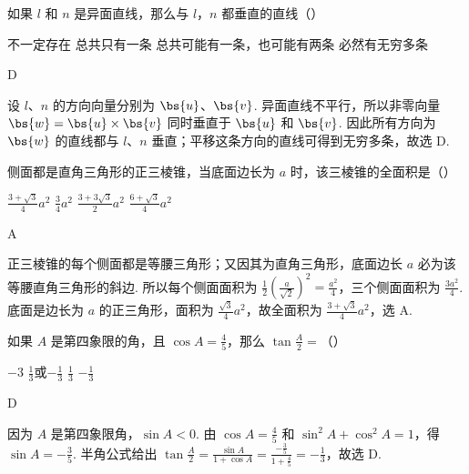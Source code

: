 \documentclass[UTF8,a4paper,oneside,11pt]{ctexbook}
\begin{document}
\begin{problem}
如果 \(l\) 和 \(n\) 是异面直线，那么与 \(l\)，\(n\) 都垂直的直线（\quad）

\choices
    {不一定存在}
    {总共只有一条}
    {总共可能有一条，也可能有两条}
    {必然有无穷多条}
\end{problem}

\begin{answer}
D
\end{answer}

\begin{solution}
设 \(l\)、\(n\) 的方向向量分别为 \(\bs{u}\)、\(\bs{v}\). 异面直线不平行，所以非零向量 \(\bs{w}=\bs{u}\times\bs{v}\) 同时垂直于 \(\bs{u}\) 和 \(\bs{v}\). 因此所有方向为 \(\bs{w}\) 的直线都与 \(l\)、\(n\) 垂直；平移这条方向的直线可得到无穷多条，故选 D.
\end{solution}

\begin{problem}
侧面都是直角三角形的正三棱锥，当底面边长为 \(a\) 时，该三棱锥的全面积是（\quad）

\choices
    {\(\frac{3+\sqrt{3}}{4}a^2\)}
    {\(\frac{3}{4}a^2\)}
    {\(\frac{3+3\sqrt{3}}{2}a^2\)}
    {\(\frac{6+\sqrt{3}}{4}a^2\)}
\end{problem}

\begin{answer}
A
\end{answer}

\begin{solution}
正三棱锥的每个侧面都是等腰三角形；又因其为直角三角形，底面边长 \(a\) 必为该等腰直角三角形的斜边. 所以每个侧面面积为 \(\frac12\left(\frac a{\sqrt2}\right)^2=\frac{a^2}{4}\)，三个侧面面积为 \(\frac{3a^2}{4}\). 底面是边长为 \(a\) 的正三角形，面积为 \(\frac{\sqrt3}{4}a^2\)，故全面积为 \(\frac{3+\sqrt3}{4}a^2\)，选 A.
\end{solution}

\begin{problem}
如果 \(A\) 是第四象限的角，且 \(\cos A=\frac{4}{5}\)，那么 \(\tan \frac{A}{2}=\)（\quad）

\choices
    {\(-3\)}
    {\(\frac{1}{3}\)或\(-\frac{1}{3}\)}
    {\(\frac{1}{3}\)}
    {\(-\frac{1}{3}\)}
\end{problem}

\begin{answer}
D
\end{answer}

\begin{solution}
因为 \(A\) 是第四象限角，\(\sin A<0\). 由 \(\cos A=\frac45\) 和 \(\sin^2A+\cos^2A=1\)，得 \(\sin A=-\frac35\). 半角公式给出 \(\tan\frac A2=\frac{\sin A}{1+\cos A}=\frac{-\frac{3}{5}}{1+\frac{4}{5}}=-\frac13\)，故选 D.
\end{solution}
\end{document}
